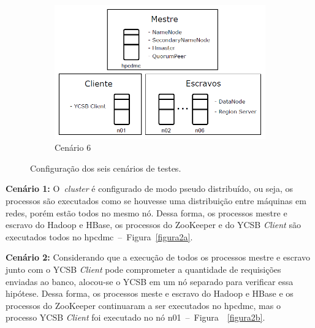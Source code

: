\documentclass[12pt]{article}
\begin{document}
\begin{figure}
\begin{subfigure}{0.35\textwidth}
        \includegraphics[width=1.0\textwidth]{images/cenario-6.png}
        \caption{Cenário 6}%
        \label{figura2f}
    \end{subfigure}
    \caption{Configuração dos seis cenários de testes.}
\end{figure}

\textbf{Cenário 1:} O~\emph{cluster} é configurado de modo pseudo distribuído, ou seja, os processos são executados como se houvesse uma distribuição entre máquinas em redes, porém estão todos no mesmo nó. Dessa forma, os processos mestre e escravo do Hadoop e HBase, os processos do ZooKeeper e do YCSB \emph{Client} são executados todos no hpcdmc~--~Figura~\ref{figura2a}.

\textbf{Cenário 2:} Considerando que a execução de todos os processos mestre e escravo junto com o YCSB \emph{Client} pode comprometer a quantidade de requisições enviadas ao banco, alocou-se o YCSB em um nó separado para verificar essa hipótese. Dessa forma, os processos meste e escravo do Hadoop e HBase e os processos do ZooKeeper continuaram a ser executados no hpcdmc, mas o processo YCSB \emph{Client} foi executado no nó n01~--~Figura~~\ref{figura2b}.
\end{document}
